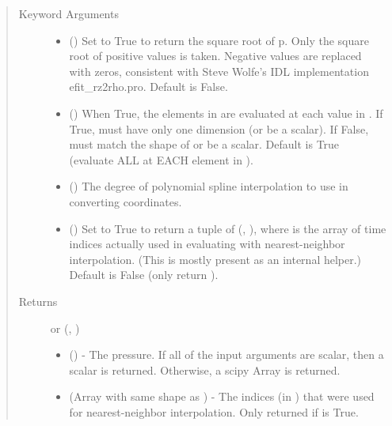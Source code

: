 \documentclass[letterpaper,10pt,english]{sphinxmanual}
\begin{document}
\begin{fulllineitems}
\begin{fulllineitems}
\begin{quote}
\begin{description}
\item[{Keyword Arguments}] \leavevmode\begin{itemize}
\item {} 
 () \textendash{} Set to True to return the square root of p.
Only the square root of positive values is taken. Negative
values are replaced with zeros, consistent with Steve Wolfe’s
IDL implementation efit\_rz2rho.pro. Default is False.

\item {} 
 () \textendash{} When True, the elements in  are evaluated
at each value in . If True,  must have only one dimension
(or be a scalar). If False,  must match the shape of 
or be a scalar. Default is True (evaluate ALL  at EACH
element in ).

\item {} 
 () \textendash{} The degree of polynomial spline interpolation to
use in converting coordinates.

\item {} 
 () \textendash{} Set to True to return a tuple of (,
), where  is the array of time indices
actually used in evaluating  with nearest-neighbor
interpolation. (This is mostly present as an internal helper.)
Default is False (only return ).

\end{itemize}

\item[{Returns}] \leavevmode

 or (, )
\begin{itemize}
\item {} 
 () - The pressure. If
all of the input arguments are scalar, then a scalar is returned.
Otherwise, a scipy Array is returned.

\item {} 
 (Array with same shape as ) - The indices
(in ) that were used for
nearest-neighbor interpolation. Only returned if  is
True.


\end{itemize}
\end{description}
\end{quote}
\end{fulllineitems}
\end{fulllineitems}
\end{document}
